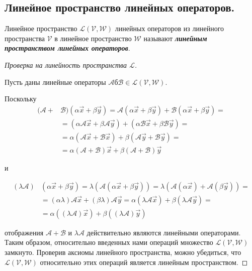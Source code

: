 \subsection{
    Линейное пространство линейных операторов.
}

\begin{definition}
    Линейное пространство $\mathcal{L}(\mathcal{V}, \mathcal{W})$ линейных операторов из линейного пространства $\mathcal{V}$ в линейное пространство $\mathcal{W}$ называют \textbf{\textit{линейным пространством линейных операторов}}.
\end{definition}

\begin{proof}[Проверка на линейность пространства $\mathcal{L}$]~

    Пусть даны линейные операторы $\mathscr{A}б \mathscr{B} \in \mathcal{L}(\mathcal{V}, \mathcal{W})$. 

    Поскольку
    \begin{align*}
        (\mathscr{A} + &\mathscr{B})(\alpha\vec{x} + \beta \vec{y}) = \mathscr{A}(\alpha\vec{x} + \beta \vec{y}) + \mathscr{B}(\alpha\vec{x} + \beta \vec{y}) = \\
        &= (\alpha\mathscr{A}\vec{x} + \beta\mathscr{A}\vec{y}) + (\alpha\mathscr{B}\vec{x} + \beta\mathscr{B}\vec{y}) = \\
        &= \alpha(\mathscr{A}\vec{x} + \mathscr{B}\vec{x}) + \beta(\mathscr{A}\vec{y} + \mathscr{B}\vec{y}) = \\
        &= \alpha(\mathscr{A} + \mathscr{B})\vec{x} + \beta(\mathscr{A} + \mathscr{B})\vec{y}
    \end{align*}

    и

    \begin{align*}
        (\lambda\mathscr{A})&(\alpha\vec{x} + \beta \vec{y}) = \lambda(\mathscr{A}(\alpha\vec{x} + \beta\vec{y})) = \lambda (\mathscr{A}(\alpha\vec{x}) + \mathscr{A}(\beta\vec{y})) = \\ 
        &= (\alpha \lambda)\mathscr{A}\vec{x} + (\beta \lambda)\mathscr{A}\vec{y} = \alpha(\lambda \mathscr{A}\vec{x}) + \beta(\lambda \mathscr{A}\vec{y}) = \\
        &= \alpha((\lambda\mathscr{A})\vec{x}) + \beta((\lambda\mathscr{A})\vec{y})
    \end{align*}

    отображения $\mathscr{A} + \mathscr{B}$ и $\lambda \mathscr{A}$ действительно являются линейными операторами. Таким образом, относительно введенных нами операций множество $\mathcal{L}(\mathcal{V}, \mathcal{W})$ замкнуто. Проверив аксиомы линейного пространства, можно убедиться, что $\mathcal{L}(\mathcal{V}, \mathcal{W})$ относительно этих операций является линейным пространством.
\end{proof}

